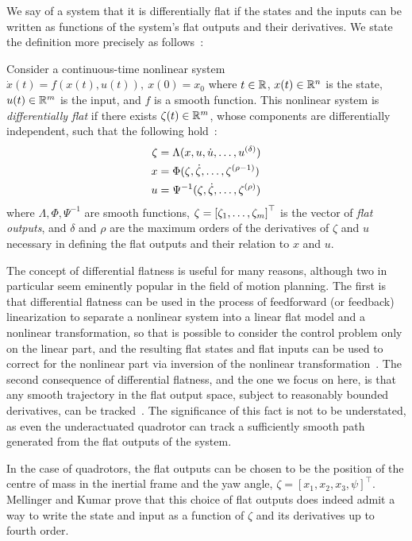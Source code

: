 We say of a system that it is differentially flat if the states and the inputs can be written as functions of the system's flat outputs and their derivatives. We state the definition more precisely as follows~\cite{Greeff2018}:
\begin{defn}
    Consider a continuous-time nonlinear system $\dot x(t) = f(x(t),u(t)),\ x(0) = x_0$ where $t \in \mathbb{R}$, $x(t) \in \mathbb{R}^n$ is the state, $u(t) \in \mathbb{R}^m$ is the input, and $f$ is a smooth function. This nonlinear system is \emph{differentially flat} if there exists $\zeta(t) \in \mathbb{R}^m$, whose components are differentially independent, such that the following hold~\cite{Fliess1995}:
    \begin{align*}
        \zeta &= \Lambda(x, u, \dot u, \mathellipsis, u^{(\delta)}) \\
            x &= \Phi(\zeta, \dot \zeta, \mathellipsis, \zeta^{(\rho-1)}) \\
            u &= \Psi^{-1}(\zeta, \dot \zeta, \mathellipsis, \zeta^{(\rho)})
    \end{align*}
    where $\Lambda, \Phi, \Psi^{-1}$ are smooth functions, $\zeta = {[\zeta_1, \mathellipsis, \zeta_m]}^\top$ is the vector of \emph{flat outputs}, and $\delta$ and $\rho$ are the maximum orders of the derivatives of $\zeta$ and $u$ necessary in defining the flat outputs and their relation to $x$ and $u$.
\end{defn}
The concept of differential flatness is useful for many reasons, although two in particular seem eminently popular in the field of motion planning. The first is that differential flatness can be used in the process of feedforward (or feedback) linearization to separate a nonlinear system into a linear flat model and a nonlinear transformation, so that is possible to consider the control problem only on the linear part, and the resulting flat states and flat inputs can be used to correct for the nonlinear part via inversion of the nonlinear transformation~\cite{Greeff2018,VanNieuwstadt1998}. The second consequence of differential flatness, and the one we focus on here, is that any smooth trajectory in the flat output space, subject to reasonably bounded derivatives, can be tracked~\cite{Mellinger2011}. The significance of this fact is not to be understated, as even the underactuated quadrotor can track a sufficiently smooth path generated from the flat outputs of the system.

In the case of quadrotors, the flat outputs can be chosen to be the position of the centre of mass in the inertial frame and the yaw angle, $\zeta = {[x_1, x_2, x_3, \psi]}^\top$. Mellinger and Kumar prove that this choice of flat outputs does indeed admit a way to write the state and input as a function of $\zeta$ and its derivatives up to fourth order.



